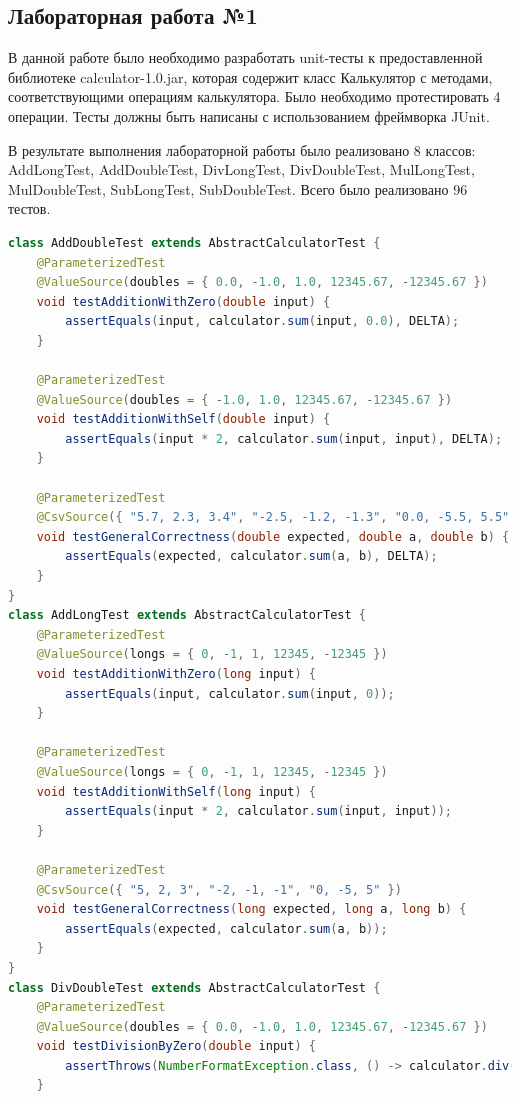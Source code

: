 \documentclass[a4paper]{article}
\begin{document}
    \subsection{Лабораторная работа №1}
    В данной работе было необходимо разработать unit-тесты к предоставленной библиотеке calculator-1.0.jar, которая содержит класс Калькулятор с методами, соответствующими операциям калькулятора. Было необходимо протестировать 4 операции. Тесты должны быть написаны с использованием фреймворка JUnit. \par
    В результате выполнения лабораторной работы было реализовано 8 классов: AddLongTest, AddDoubleTest, DivLongTest, DivDoubleTest, MulLongTest, MulDoubleTest, SubLongTest, SubDoubleTest. Всего было реализовано 96 тестов.
    \begin{lstlisting}[language=Java]
class AddDoubleTest extends AbstractCalculatorTest {
    @ParameterizedTest
    @ValueSource(doubles = { 0.0, -1.0, 1.0, 12345.67, -12345.67 })
    void testAdditionWithZero(double input) {
        assertEquals(input, calculator.sum(input, 0.0), DELTA);
    }

    @ParameterizedTest
    @ValueSource(doubles = { -1.0, 1.0, 12345.67, -12345.67 })
    void testAdditionWithSelf(double input) {
        assertEquals(input * 2, calculator.sum(input, input), DELTA);
    }

    @ParameterizedTest
    @CsvSource({ "5.7, 2.3, 3.4", "-2.5, -1.2, -1.3", "0.0, -5.5, 5.5" })
    void testGeneralCorrectness(double expected, double a, double b) {
        assertEquals(expected, calculator.sum(a, b), DELTA);
    }
}
class AddLongTest extends AbstractCalculatorTest {
    @ParameterizedTest
    @ValueSource(longs = { 0, -1, 1, 12345, -12345 })
    void testAdditionWithZero(long input) {
        assertEquals(input, calculator.sum(input, 0));
    }

    @ParameterizedTest
    @ValueSource(longs = { 0, -1, 1, 12345, -12345 })
    void testAdditionWithSelf(long input) {
        assertEquals(input * 2, calculator.sum(input, input));
    }

    @ParameterizedTest
    @CsvSource({ "5, 2, 3", "-2, -1, -1", "0, -5, 5" })
    void testGeneralCorrectness(long expected, long a, long b) {
        assertEquals(expected, calculator.sum(a, b));
    }
}
class DivDoubleTest extends AbstractCalculatorTest {
    @ParameterizedTest
    @ValueSource(doubles = { 0.0, -1.0, 1.0, 12345.67, -12345.67 })
    void testDivisionByZero(double input) {
        assertThrows(NumberFormatException.class, () -> calculator.div(input, 0.0));
    }


\end{lstlisting}
\end{document}
